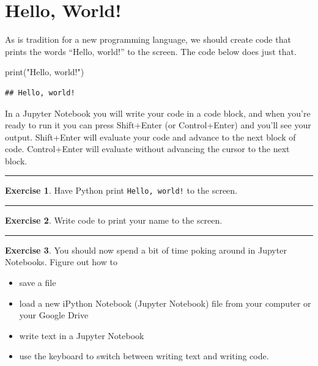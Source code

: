 \documentclass[
]{book}
\newenvironment{Shaded}{\begin{snugshade}}{\end{snugshade}}
\newcommand{\BuiltInTok}[1]{#1}
\newcommand{\NormalTok}[1]{#1}
\newcommand{\StringTok}[1]{\textcolor[rgb]{0.31,0.60,0.02}{#1}}
\providecommand{\tightlist}{%
  \setlength{\itemsep}{0pt}\setlength{\parskip}{0pt}}
\theoremstyle{definition}
\theoremstyle{definition}
\theoremstyle{definition}
\newtheorem{exercise}{Exercise}[chapter]
\theoremstyle{remark}
\begin{document}
\hypertarget{hello-world}{%
\section{Hello, World!}\label{hello-world}}

As is tradition for a new programming language, we should create code that prints the words ``Hello, world!'' to the screen. The code below does just that.

\begin{Shaded}
\begin{Highlighting}[]
\BuiltInTok{print}\NormalTok{(}\StringTok{"Hello, world!"}\NormalTok{)}
\end{Highlighting}
\end{Shaded}

\begin{verbatim}
## Hello, world!
\end{verbatim}

In a Jupyter Notebook you will write your code in a code block, and when you're ready to run it you can press Shift+Enter (or Control+Enter) and you'll see your output. Shift+Enter will evaluate your code and advance to the next block of code. Control+Enter will evaluate without advancing the cursor to the next block.

\begin{center}\rule{0.5\linewidth}{0.5pt}\end{center}

\begin{exercise}
\protect\hypertarget{exr:unnamed-chunk-622}{}{\label{exr:unnamed-chunk-622} }Have Python print \texttt{Hello,\ world!} to the screen.
\end{exercise}

\begin{center}\rule{0.5\linewidth}{0.5pt}\end{center}

\begin{exercise}
\protect\hypertarget{exr:unnamed-chunk-623}{}{\label{exr:unnamed-chunk-623} }Write code to print your name to the screen.
\end{exercise}

\begin{center}\rule{0.5\linewidth}{0.5pt}\end{center}

\begin{exercise}
\protect\hypertarget{exr:unnamed-chunk-624}{}{\label{exr:unnamed-chunk-624} }You should now spend a bit of time poking around in Jupyter Notebooks. Figure out how to

\begin{itemize}
\tightlist
\item
  save a file
\item
  load a new iPython Notebook (Jupyter Notebook) file from your computer or your Google Drive
\item
  write text in a Jupyter Notebook
\item
  use the keyboard to switch between writing text and writing code.
\end{itemize}
\end{exercise}
\end{document}
